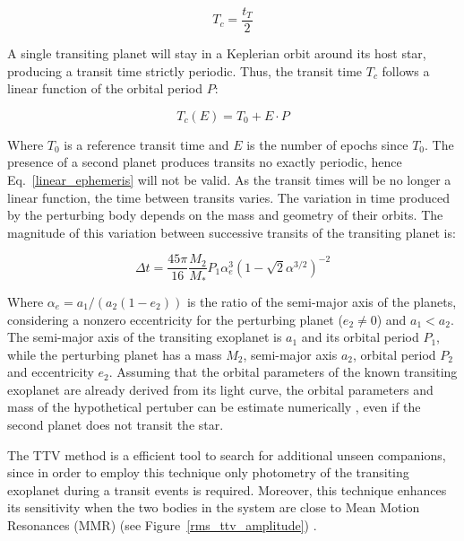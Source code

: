 \begin{equation}
T_{c} = \frac{t_T}{2}
\end{equation}

A single transiting planet will stay in a Keplerian orbit around its host star, producing a transit time strictly periodic. Thus, the transit time $T_c$ follows a linear function of the orbital period $P$: 

\begin{equation}
T_{c}(E) = T_{0} + E \cdot P
\label{linear_ephemeris} 
\end{equation}

Where $T_0$ is a reference transit time and $E$ is the number of epochs since $T_0$.  The presence of a second planet produces transits no exactly periodic, hence Eq.~\ref{linear_ephemeris} will not be valid. As the transit times will be no longer a linear function,  the time between  transits varies.  The variation in time produced by the perturbing body depends on the mass and geometry of their orbits. The magnitude of this variation between successive transits of the transiting planet is:

\begin{equation}
\Delta t = \frac{45\pi}{16} \frac{M_2}{M_*} P_{1} \alpha^3_{e} (1-	\sqrt{2}\alpha^{3/2})^{-2}
\label{delta_t}
\end{equation}

Where $\alpha_e = a_1/(a_2(1-e_2))$ is the ratio of the semi-major axis of the planets, considering a nonzero eccentricity for the perturbing planet ($e_2 \neq 0$) and $a_1 < a_2$. The semi-major axis of the transiting exoplanet is $a_1$ and its orbital period $P_1$, while the perturbing planet has a mass $M_2$, semi-major axis $a_2$, orbital period $P_2$ and eccentricity $e_2$. Assuming that the orbital parameters of the known transiting exoplanet are already derived from its light curve, the orbital parameters and mass of the hypothetical pertuber can be estimate numerically \citep{Nesvorny2008,Nesvorny2009}, even if the second planet does not transit the star. 

The TTV method is a efficient tool to search for additional unseen companions, since in order to employ this technique only photometry of the transiting exoplanet during a transit events is required. Moreover, this technique enhances its sensitivity when the two bodies in the system are close to Mean Motion Resonances (MMR) \citep{Agol2005,Steffen2005,Agol2007} (see Figure~\ref{rms_ttv_amplitude}) . 

